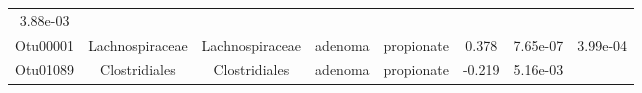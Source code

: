 \documentclass[11pt,]{article}
\begin{document}
\begin{longtable}[]{@{}cccccccc@{}}
\begin{minipage}[t]{0.08\columnwidth}
3.88e-03\strut
\end{minipage}\tabularnewline
\begin{minipage}[t]{0.08\columnwidth}\centering\strut
Otu00001\strut
\end{minipage} & \begin{minipage}[t]{0.15\columnwidth}\centering\strut
Lachnospiraceae\strut
\end{minipage} & \begin{minipage}[t]{0.15\columnwidth}\centering\strut
Lachnospiraceae\strut
\end{minipage} & \begin{minipage}[t]{0.08\columnwidth}\centering\strut
adenoma\strut
\end{minipage} & \begin{minipage}[t]{0.09\columnwidth}\centering\strut
propionate\strut
\end{minipage} & \begin{minipage}[t]{0.07\columnwidth}\centering\strut
0.378\strut
\end{minipage} & \begin{minipage}[t]{0.08\columnwidth}\centering\strut
7.65e-07\strut
\end{minipage} & \begin{minipage}[t]{0.08\columnwidth}\centering\strut
3.99e-04\strut
\end{minipage}\tabularnewline
\begin{minipage}[t]{0.08\columnwidth}\centering\strut
Otu01089\strut
\end{minipage} & \begin{minipage}[t]{0.15\columnwidth}\centering\strut
Clostridiales\strut
\end{minipage} & \begin{minipage}[t]{0.15\columnwidth}\centering\strut
Clostridiales\strut
\end{minipage} & \begin{minipage}[t]{0.08\columnwidth}\centering\strut
adenoma\strut
\end{minipage} & \begin{minipage}[t]{0.09\columnwidth}\centering\strut
propionate\strut
\end{minipage} & \begin{minipage}[t]{0.07\columnwidth}\centering\strut
-0.219\strut
\end{minipage} & \begin{minipage}[t]{0.08\columnwidth}\centering\strut
5.16e-03\strut
\end{minipage} & \begin{minipage}[t]{0.08\columnwidth}\centering\strut

\end{minipage}
\end{longtable}
\end{document}
